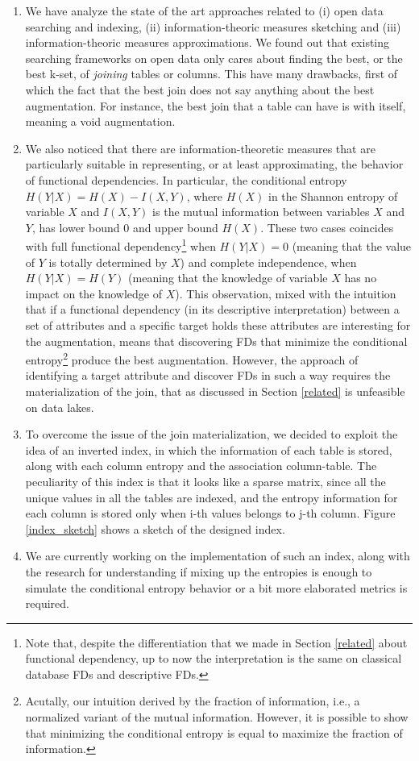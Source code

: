 \begin{enumerate}
    \item We have analyze the state of the art approaches related to (i) open data searching and indexing, (ii) information-theoric measures sketching and (iii) information-theoric measures approximations. We found out that existing searching frameworks on open data only cares about finding the best, or the best k-set, of \textit{joining} tables or columns. This have many drawbacks, first of which the fact that the best join does not say anything about the best augmentation. For instance, the best join that a table can have is with itself, meaning a void augmentation. 
    \item We also noticed that there are information-theoretic measures that are particularly suitable in representing, or at least approximating, the behavior of functional dependencies. In particular, the conditional entropy $H(Y|X) = H(X)-I(X,Y)$, where $H(X)$ in the Shannon entropy of variable $X$ and $I(X,Y)$ is the mutual information between variables $X$ and $Y$, has lower bound 0 and upper bound $H(X)$. These two cases coincides with full functional dependency\footnote{Note that, despite the differentiation that we made in Section \ref{related} about functional dependency, up to now the interpretation is the same on classical database FDs and descriptive FDs.} when $H(Y|X) = 0$ (meaning that the value of $Y$ is totally determined by $X$) and complete independence, when $H(Y|X) = H(Y)$ (meaning that the knowledge of variable $X$ has no impact on the knowledge of $X$). This observation, mixed with the intuition that if a functional dependency (in its descriptive interpretation) between a set of attributes and a specific target holds these attributes are interesting for the augmentation, means that discovering FDs that minimize the conditional entropy\footnote{Acutally, our intuition derived by the fraction of information, i.e., a normalized variant of the mutual information. However, it is possible to show that minimizing the conditional entropy is equal to maximize the fraction of information.} produce the best augmentation. However, the approach of identifying a target attribute and discover FDs in such a way requires the materialization of the join, that as discussed in Section \ref{related} is unfeasible on data lakes.
    \item To overcome the issue of the join materialization, we decided to exploit the idea of an inverted index, in which the information of each table is stored, along with each column entropy and the association column-table. The peculiarity of this index is that it looks like a sparse matrix, since all the unique values in all the tables are indexed, and the entropy information for each column is stored only when i-th values belongs to j-th column. Figure \ref{index_sketch} shows a sketch of the designed index.
    \item We are currently working on the implementation of such an index, along with the research for understanding if mixing up the entropies is enough to simulate the conditional entropy behavior or a bit more elaborated metrics is required.
\end{enumerate}



